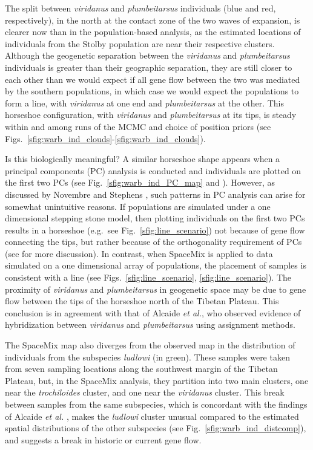 \documentclass[10pt,letterpaper]{article}
\begin{document}
The split between \textit{viridanus} and \textit{plumbeitarsus} individuals (blue and red, respectively), in the north at the contact zone of the two waves of expansion, is clearer now than in the population-based analysis, as the estimated locations of individuals from the Stolby population are near their respective clusters. 
Although the geogenetic separation between the \textit{viridanus} and \textit{plumbeitarsus} individuals is greater than their geographic separation, 
they are still closer to each other than we would expect if all gene flow between the two was mediated by the southern populations,
in which case we would expect the populations to form a line, 
with \textit{viridanus} at one end and \textit{plumbeitarsus} at the other. 
This horseshoe configuration, with \textit{viridanus} and \textit{plumbeitarsus} at its tips, is steady within and among runs of the MCMC and choice of position priors (see Figs.\ \ref{sfig:warb_ind_clouds}-\ref{sfig:warb_ind_clouds}).  

Is this biologically meaningful?  A similar horseshoe shape appears when a principal components (PC) analysis is conducted and individuals are plotted on the first two PCs (see Fig.\ \ref{sfig:warb_ind_PC_map} and \cite{alcaide2014genomic}).  
However, as discussed by Novembre and Stephens \cite{novembre_interpreting_2008}, such patterns in PC analysis can arise for somewhat unintuitive reasons. If populations are simulated under a one dimensional stepping stone model, then plotting individuals on the first two PCs results in a horseshoe (e.g.\ see Fig.\ \ref{sfig:line_scenario}) not because of gene flow connecting the tips, but rather because of the orthogonality requirement of PCs (see \cite{novembre_interpreting_2008} for more discussion).  In contrast, when SpaceMix is applied to data simulated on a one dimensional array of populations, the placement of samples is consistent with a line (see Figs.\ \ref{sfig:line_scenario}, \ref{sfig:line_scenario}). The proximity of \textit{viridanus} and \textit{plumbeitarsus} in geogenetic space may be due to gene flow between the tips of the horseshoe north of the Tibetan Plateau. This conclusion is in agreement with that of Alcaide \emph{et al.}\cite{alcaide2014genomic}, who observed evidence of hybridization between \textit{viridanus} and \textit{plumbeitarsus} using assignment methods.

The SpaceMix map also diverges from the observed map in the distribution of individuals from the subspecies \textit{ludlowi} (in green).  These samples were taken from seven sampling locations along the southwest margin of the Tibetan Plateau, but, in the SpaceMix analysis, they partition into two main clusters, one near the \textit{trochiloides} cluster, and one near the \textit{viridanus} cluster.  This break between samples from the same subspecies, which is concordant with the findings of Alcaide \emph{et al.} \cite{alcaide2014genomic}, makes the \textit{ludlowi} cluster unusual compared to the estimated spatial distributions of the other subspecies (see Fig.\ \ref{sfig:warb_ind_distcomp}), and suggests a break in historic or current gene flow.
\end{document}
